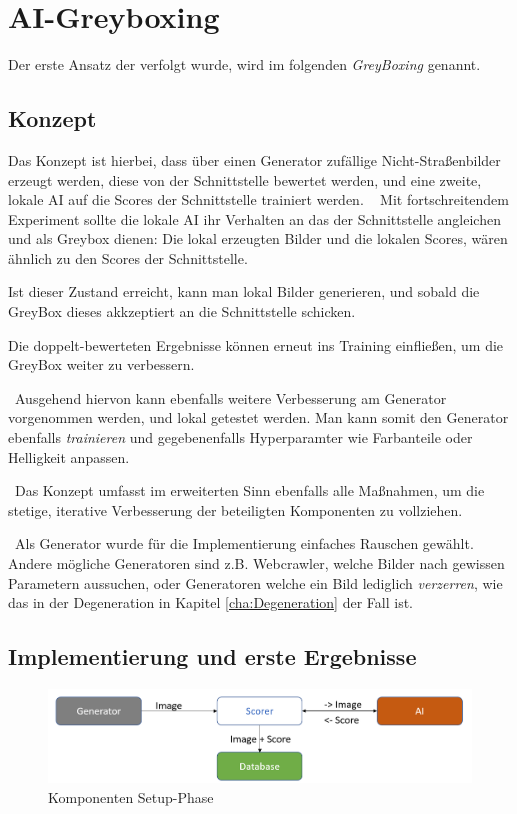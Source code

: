 \chapter{AI-Greyboxing}
\label{cha:GreyBoxing}
Der erste Ansatz der verfolgt wurde, wird im folgenden \textit{GreyBoxing} genannt.
\section{Konzept}
\label{sec:KonzeptGreyBoxing}
Das Konzept ist hierbei, dass über einen Generator zufällige Nicht-Straßenbilder erzeugt werden, diese von der Schnittstelle bewertet werden, und eine zweite, lokale AI auf die Scores der Schnittstelle trainiert werden. 
~\newline
Mit fortschreitendem Experiment sollte die lokale AI ihr Verhalten an das der Schnittstelle angleichen und als Greybox dienen: Die lokal erzeugten Bilder und die lokalen Scores, wären ähnlich zu den Scores der Schnittstelle. 

Ist dieser Zustand erreicht, kann man lokal Bilder generieren, und sobald die GreyBox dieses akkzeptiert an die Schnittstelle schicken. 

Die doppelt-bewerteten Ergebnisse können erneut ins Training einfließen, um die GreyBox weiter zu verbessern. 

~\newline Ausgehend hiervon kann ebenfalls weitere Verbesserung am Generator vorgenommen werden, und lokal getestet werden.
Man kann somit den Generator ebenfalls \textit{trainieren} und gegebenenfalls Hyperparamter wie Farbanteile oder Helligkeit anpassen. 

~\newline Das Konzept umfasst im erweiterten Sinn ebenfalls alle Maßnahmen, um die stetige, iterative Verbesserung der beteiligten Komponenten zu vollziehen.      

~\newline Als Generator wurde für die Implementierung einfaches Rauschen gewählt. Andere mögliche Generatoren sind z.B. Webcrawler, welche Bilder nach gewissen Parametern aussuchen, oder Generatoren welche ein Bild lediglich \textit{verzerren}, wie das in der Degeneration in Kapitel \ref{cha:Degeneration} der Fall ist. 

\section{Implementierung und erste Ergebnisse}
\label{sec:ImplementierungGreyBoxing}
\begin{figure}[h]
	\centering
	\includegraphics[width=0.9\linewidth]{Images/GreyBoxingStart}
	\caption[Komponenten Setup-Phase]{Komponenten Setup-Phase}
	\label{fig:greyboxingstart}
\end{figure}


